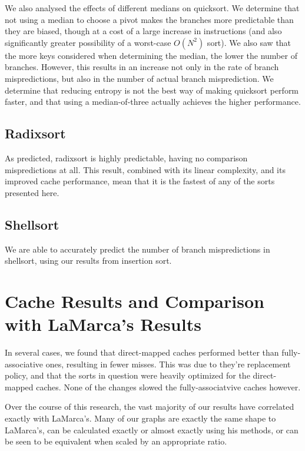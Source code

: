 We also analysed the effects of different medians on quicksort. We determine that
not using a median to choose a pivot makes the branches more predictable than
they are biased, though at a cost of a large increase in instructions (and also
significantly greater possibility of a worst-case $O(N^2)$ sort). We also saw
that the more keys considered when determining the median, the lower the number
of branches. However, this results in an increase not only in the rate of branch
mispredictions, but also in the number of actual branch misprediction. We
determine that reducing entropy is not the best way of making quicksort perform
faster, and that using a median-of-three actually achieves the higher
performance.


\subsection{Radixsort}

As predicted, radixsort is highly predictable, having no comparison
mispredictions at all. This result, combined with its linear complexity, and its
improved cache performance, mean that it is the fastest of any of the sorts
presented here.


\subsection{Shellsort}

We are able to accurately predict the number of branch mispredictions in
shellsort, using our results from insertion sort. 

\section{Cache Results and Comparison with LaMarca's Results}

In several cases, we found that direct-mapped caches performed better than
fully-associative ones, resulting in fewer misses. This was due to they're
replacement policy, and that the sorts in question were heavily optimized for
the direct-mapped caches. None of the changes slowed the fully-associatvive
caches however.

Over the course of this research, the vast majority of our results have
correlated exactly with LaMarca's. Many of our graphs are exactly the same
shape to LaMarca's, can be calculated exactly or almost exactly using his
methods, or can be seen to be equivalent when scaled by an appropriate ratio.


